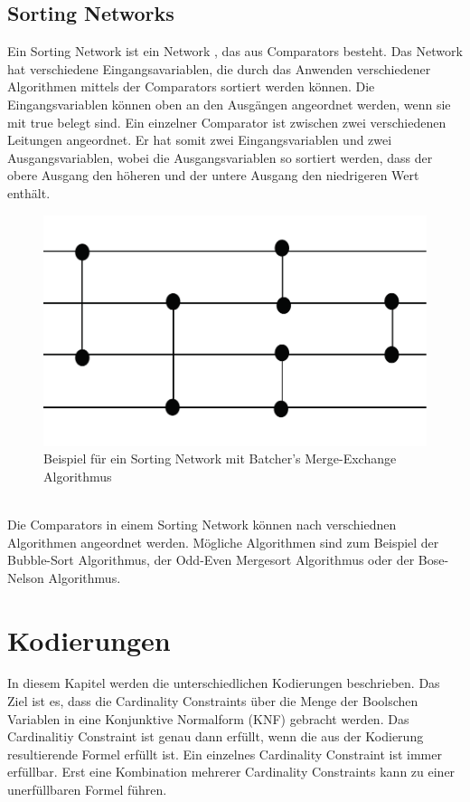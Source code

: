 \documentclass[a4,abstract=on]{scrartcl}
\newcommand*\stdsection{}
\let\stdsection\section
\renewcommand*\section{%
    \clearpage\ifodd\value{page}\else\mbox{}\clearpage\fi
    \stdsection}
\begin{document}
\subsection{Sorting Networks}
Ein Sorting Network ist ein Network \cite[vgl.][]{sorting}, das aus Comparators besteht. Das Network hat verschiedene Eingangsavariablen, die durch das Anwenden verschiedener Algorithmen mittels der Comparators sortiert werden können. Die Eingangsvariablen können oben an den Ausgängen angeordnet werden, wenn sie mit true belegt sind. Ein einzelner Comparator ist zwischen zwei verschiedenen Leitungen angeordnet. Er hat somit zwei Eingangsvariablen und zwei Ausgangsvariablen, wobei die Ausgangsvariablen so sortiert werden, dass der obere Ausgang den höheren und der untere Ausgang den niedrigeren Wert enthält.

\begin{figure}[H]
\centering
\includegraphics[width=\textwidth]{sorting_network_grundlage1.pdf}
\caption{Beispiel für ein Sorting Network mit Batcher's Merge-Exchange Algorithmus}
\label{fig:network_grundlage}
\end{figure}
\ \\
Die Comparators in einem Sorting Network können nach verschiednen Algorithmen angeordnet werden. Mögliche Algorithmen sind zum Beispiel der Bubble-Sort Algorithmus, der Odd-Even Mergesort Algorithmus oder der Bose-Nelson Algorithmus.

\section{Kodierungen}
In diesem Kapitel werden die unterschiedlichen Kodierungen beschrieben. Das Ziel ist es, dass die Cardinality Constraints über die Menge der Boolschen Variablen in eine Konjunktive Normalform (KNF) gebracht werden. %
Das Cardinalitiy Constraint ist genau dann erfüllt, wenn die aus der Kodierung resultierende Formel erfüllt ist. Ein einzelnes Cardinality Constraint ist immer erfüllbar. Erst eine Kombination mehrerer Cardinality Constraints kann zu einer unerfüllbaren Formel führen.
\end{document}
